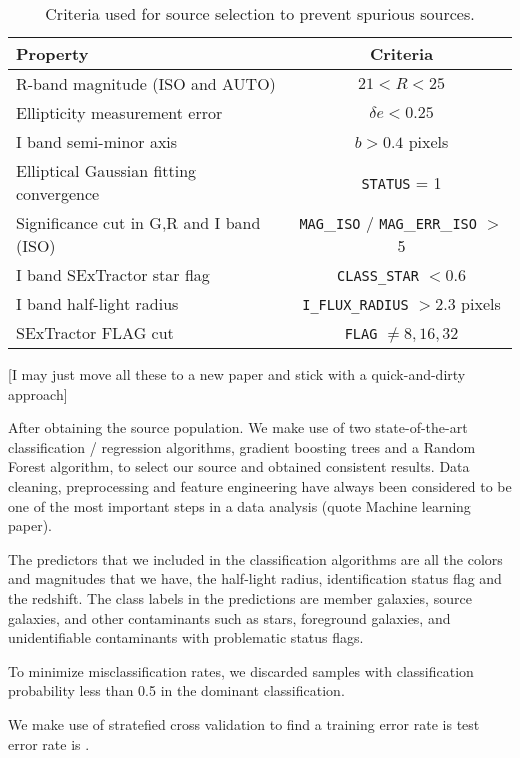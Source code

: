 \documentclass[letterpaper,useAMS,usenatbib]{mn2e}
\def\code#1{\texttt{#1}}
\begin{document}
\begin{table}
	\caption{Criteria used for source selection to prevent spurious sources.} 
\begin{center} 
\begin{tabular}{@{}lc}
\toprule Property & Criteria \\ \toprule
R-band magnitude (ISO and AUTO)  & $21 <  R < 25$ \\
Ellipticity measurement error & $\delta e < 0.25$ \\
I band semi-minor axis & $b > 0.4$ pixels \\
Elliptical Gaussian fitting convergence & \code{STATUS} = 1\\
Significance cut in G,R and I band (ISO) & \code{MAG}\_{\code{ISO}} /
\code{MAG}\_\code{ERR}\_{\code{ISO}} $>$ 5 \\ 
I band SExTractor star flag& \code{CLASS\_STAR} $ < 0.6$ \\
I band half-light radius & \code{I\_FLUX\_RADIUS} $ > 2.3$ pixels\\
SExTractor FLAG cut & \code{FLAG} $\neq 8, 16, 32$\\
\bottomrule
\end{tabular} 
\end{center} 
\label{tab:cuts} 
\end{table} 
[I may just move all these to a new paper and stick with a quick-and-dirty
approach]



After obtaining the source population. 
We make use of two state-of-the-art classification / regression algorithms,
gradient boosting trees and a Random Forest algorithm,
to select our source and obtained consistent results. 
Data cleaning, preprocessing and feature engineering have always been considered to
be one of the most important steps in a data analysis (quote Machine learning
paper). 

The predictors that we included in the classification algorithms are all the
colors and magnitudes that we have, the half-light radius, identification
status flag and the redshift. 
The class labels in the predictions are 
member galaxies, source galaxies, and other contaminants such as stars,
foreground galaxies, and unidentifiable contaminants with problematic status
flags.

To minimize misclassification rates, we discarded samples with classification
probability less than 0.5 in the dominant classification. 

We make use of stratefied cross validation to find a  
training error rate is 
test error rate is .
\end{document}
